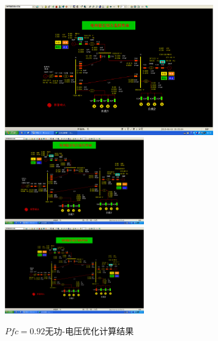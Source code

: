 \documentclass[a4paper]{ctexrep}
\begin{document}
                    \begin{figure}[htbp]
                        \centering
                        \includegraphics[width=9cm]{17.png} 
                        \includegraphics[width=6cm]{18.png} 
                        \includegraphics[width=6cm]{19.png} 
                        \caption{$Pfc=0.92$无功-电压优化计算结果}
                    \end{figure}
\end{document}
